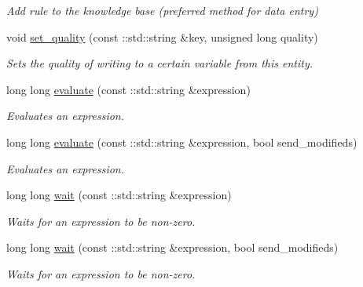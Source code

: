 \begin{DoxyCompactItemize}
\begin{DoxyCompactList}\small\item\em Add rule to the knowledge base (preferred method for data entry) \item\end{DoxyCompactList}\item 
void \hyperlink{classMadara_1_1Knowledge__Engine_1_1Knowledge__Base__Impl_a074f4328a792d83bb8b1ebaa7b902c29}{set\_\-quality} (const ::std::string \&key, unsigned long quality)
\begin{DoxyCompactList}\small\item\em Sets the quality of writing to a certain variable from this entity. \item\end{DoxyCompactList}\item 
long long \hyperlink{classMadara_1_1Knowledge__Engine_1_1Knowledge__Base__Impl_aa1e84b9b48dab5cd9f2621f18f7cbeeb}{evaluate} (const ::std::string \&expression)
\begin{DoxyCompactList}\small\item\em Evaluates an expression. \item\end{DoxyCompactList}\item 
long long \hyperlink{classMadara_1_1Knowledge__Engine_1_1Knowledge__Base__Impl_ac4d781eb339d586f911f53b5ce6ab2e2}{evaluate} (const ::std::string \&expression, bool send\_\-modifieds)
\begin{DoxyCompactList}\small\item\em Evaluates an expression. \item\end{DoxyCompactList}\item 
long long \hyperlink{classMadara_1_1Knowledge__Engine_1_1Knowledge__Base__Impl_a7927a0a1570c9ee0c95e8ba0f975ef72}{wait} (const ::std::string \&expression)
\begin{DoxyCompactList}\small\item\em Waits for an expression to be non-\/zero. \item\end{DoxyCompactList}\item 
long long \hyperlink{classMadara_1_1Knowledge__Engine_1_1Knowledge__Base__Impl_abc6620223f746149db205e584d35bcee}{wait} (const ::std::string \&expression, bool send\_\-modifieds)
\begin{DoxyCompactList}\small\item\em Waits for an expression to be non-\/zero. \item\end{DoxyCompactList}\item 

\end{DoxyCompactItemize}
